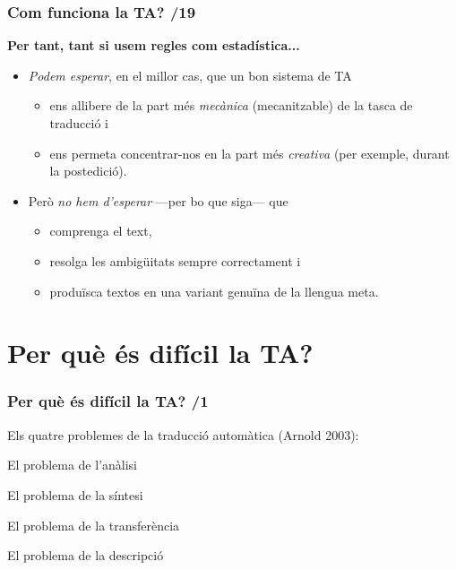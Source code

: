 \documentclass{beamer}
\newcommand{\empha}[1]{\emph{#1}\/}
\begin{document}

\begin{frame}
  \frametitle{ Com funciona la TA? /19} 
  
  \textbf{Per tant, tant si usem regles com estadística...}

  \begin{itemize}
  \item \empha{Podem esperar}, en el millor cas, que un bon sistema de TA 
    \begin{itemize}
    \item ens allibere de la
      part més \empha{mecànica} (mecanitzable) de la tasca de traducció i
    \item ens permeta concentrar-nos en la part més \empha{creativa} (per exemple, durant la postedició).
    \end{itemize}


  \item Però \empha{no hem d'esperar} ---per bo que siga--- que 
    \begin{itemize}
    \item comprenga
      el text, 
    \item resolga les ambigüitats sempre correctament i 
    \item produïsca
      textos en una variant genuïna de la llengua meta.
    \end{itemize}
  \end{itemize}

\end{frame}



\section{Per què és difícil la TA?}
\begin{frame}
  \frametitle{ Per què és difícil la TA? /1} 

   {
  {Els quatre problemes de la traducció automàtica (Arnold 2003):}
  \begin{enumerate}
   {\item El problema de l'anàlisi}
   {\item El problema de la síntesi}
   {\item El problema de la transferència}
   {\item El problema de la descripció}
  \end{enumerate}
  }

  
\end{frame}
\end{document}
